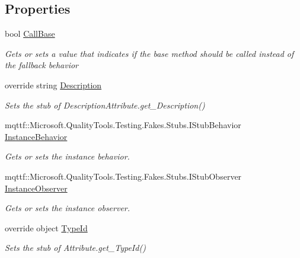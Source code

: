 \subsection*{Properties}
\begin{DoxyCompactItemize}
\item 
bool \hyperlink{class_system_1_1_component_model_1_1_fakes_1_1_stub_description_attribute_ac6869213778b74a36d650c1a6c6b0c2f}{Call\-Base}
\begin{DoxyCompactList}\small\item\em Gets or sets a value that indicates if the base method should be called instead of the fallback behavior\end{DoxyCompactList}\item 
override string \hyperlink{class_system_1_1_component_model_1_1_fakes_1_1_stub_description_attribute_ad78787d59f940242bb7e7165a26fc890}{Description}
\begin{DoxyCompactList}\small\item\em Sets the stub of Description\-Attribute.\-get\-\_\-\-Description()\end{DoxyCompactList}\item 
mqttf\-::\-Microsoft.\-Quality\-Tools.\-Testing.\-Fakes.\-Stubs.\-I\-Stub\-Behavior \hyperlink{class_system_1_1_component_model_1_1_fakes_1_1_stub_description_attribute_a74b0f8f400a05f37652453964937d820}{Instance\-Behavior}
\begin{DoxyCompactList}\small\item\em Gets or sets the instance behavior.\end{DoxyCompactList}\item 
mqttf\-::\-Microsoft.\-Quality\-Tools.\-Testing.\-Fakes.\-Stubs.\-I\-Stub\-Observer \hyperlink{class_system_1_1_component_model_1_1_fakes_1_1_stub_description_attribute_aaedef38744597b27c040345c10ccccce}{Instance\-Observer}
\begin{DoxyCompactList}\small\item\em Gets or sets the instance observer.\end{DoxyCompactList}\item 
override object \hyperlink{class_system_1_1_component_model_1_1_fakes_1_1_stub_description_attribute_ab9afc08045e303217327cab16032f6e9}{Type\-Id}
\begin{DoxyCompactList}\small\item\em Sets the stub of Attribute.\-get\-\_\-\-Type\-Id()\end{DoxyCompactList}\end{DoxyCompactItemize}


